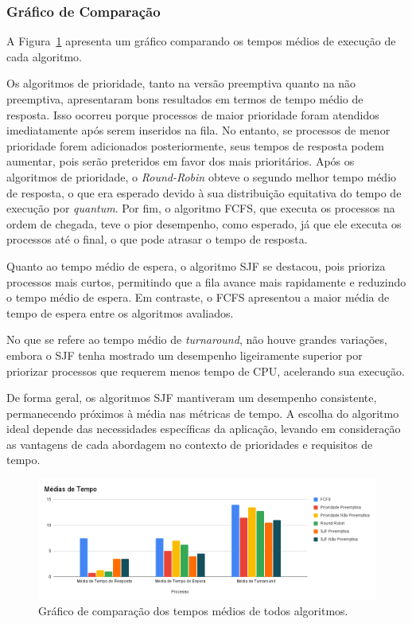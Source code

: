 \documentclass[
	12pt,				%
	oneside,   	        %
	a4paper,			%
	english,			%
	french,				%
	spanish,			%
	brazil,				%
	]{pacotes/abntex2}
\begin{document}
\subsubsection{Gráfico de Comparação}
\label{subsubsec:grafico}

A Figura~\ref{fig:media_tempo} apresenta um gráfico comparando os tempos médios de execução de cada algoritmo.

Os algoritmos de prioridade, tanto na versão preemptiva quanto na não preemptiva, apresentaram bons resultados em termos de tempo médio de resposta. Isso ocorreu porque processos de maior prioridade foram atendidos imediatamente após serem inseridos na fila. No entanto, se processos de menor prioridade forem adicionados posteriormente, seus tempos de resposta podem aumentar, pois serão preteridos em favor dos mais prioritários. Após os algoritmos de prioridade, o \textit{Round-Robin} obteve o segundo melhor tempo médio de resposta, o que era esperado devido à sua distribuição equitativa do tempo de execução por \textit{quantum}. Por fim, o algoritmo FCFS, que executa os processos na ordem de chegada, teve o pior desempenho, como esperado, já que ele executa os processos até o final, o que pode atrasar o tempo de resposta.

Quanto ao tempo médio de espera, o algoritmo SJF se destacou, pois prioriza processos mais curtos, permitindo que a fila avance mais rapidamente e reduzindo o tempo médio de espera. Em contraste, o FCFS apresentou a maior média de tempo de espera entre os algoritmos avaliados.

No que se refere ao tempo médio de \textit{turnaround}, não houve grandes variações, embora o SJF tenha mostrado um desempenho ligeiramente superior por priorizar processos que requerem menos tempo de CPU, acelerando sua execução.

De forma geral, os algoritmos SJF mantiveram um desempenho consistente, permanecendo próximos à média nas métricas de tempo. A escolha do algoritmo ideal depende das necessidades específicas da aplicação, levando em consideração as vantagens de cada abordagem no contexto de prioridades e requisitos de tempo.

\begin{figure}[H]
  \centering
  \includegraphics[scale=0.5]{figuras/ex3/grafico/media_tempo.png}
  \caption{Gráfico de comparação dos tempos médios de todos algoritmos.}
  \label{fig:media_tempo}
\end{figure}
\end{document}
